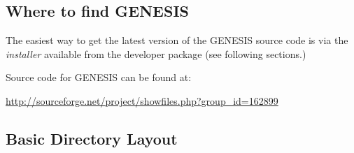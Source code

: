 \documentclass[12pt]{article}
\begin{document}
\subsection*{Where to find GENESIS}

The easiest way to get the latest version of the GENESIS source code is via the {\it installer} available from the developer package (see following sections.)

Source code for GENESIS can be found at:

\href{http://sourceforge.net/project/showfiles.php?group_id=162899}{http://sourceforge.net/project/showfiles.php?group\_id=162899}

\subsection*{Basic Directory Layout}
\end{document}
